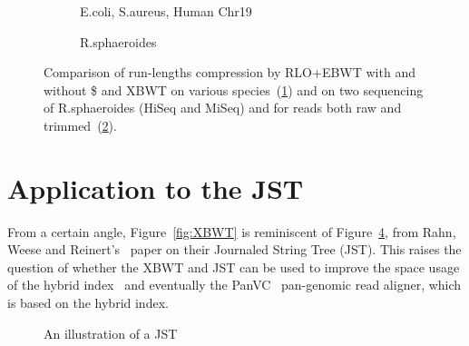 





\begin{figure}
    \captionsetup[subfigure]{justification=centering}
    \centering
    \begin{subfigure}[b]{0.49\textwidth}
        \centering
        \caption{E.coli, S.aureus, Human Chr19}
        \label{fig:realworld}
    \end{subfigure}
    \begin{subfigure}[b]{0.49\textwidth}
        \centering
        \caption{R.sphaeroides}
        \label{fig:sphaeroides}
    \end{subfigure}
    \caption{Comparison of run-lengths compression by RLO+EBWT with and without \$ and XBWT on various species~(\ref{fig:realworld}) and on two sequencing of R.sphaeroides (HiSeq and MiSeq) and for reads both raw and trimmed~(\ref{fig:sphaeroides}).}
    \label{fig:experiments}
\end{figure}




\section{Application to the JST}
\label{xbwt:sec:JST}

From a certain angle, Figure~\ref{fig:XBWT} is reminiscent of Figure~\ref{fig:JST}, from Rahn, Weese and Reinert's~\cite{DBLP:journals/bioinformatics/RahnWR14} paper on their Journaled String Tree (JST).  This raises the question of whether the XBWT and JST can be used to improve the space usage of the hybrid index~\cite{ferrada2014hybrid,gagie2015searching,ferrada2018hybrid} and eventually the PanVC~\cite{valenzuela2018towards} pan-genomic read aligner, which is based on the hybrid index.

\begin{figure}[t]
\begin{center}
\caption{An illustration of a JST~\cite{DBLP:journals/bioinformatics/RahnWR14}}
\label{fig:JST}
\end{center}
\end{figure}

